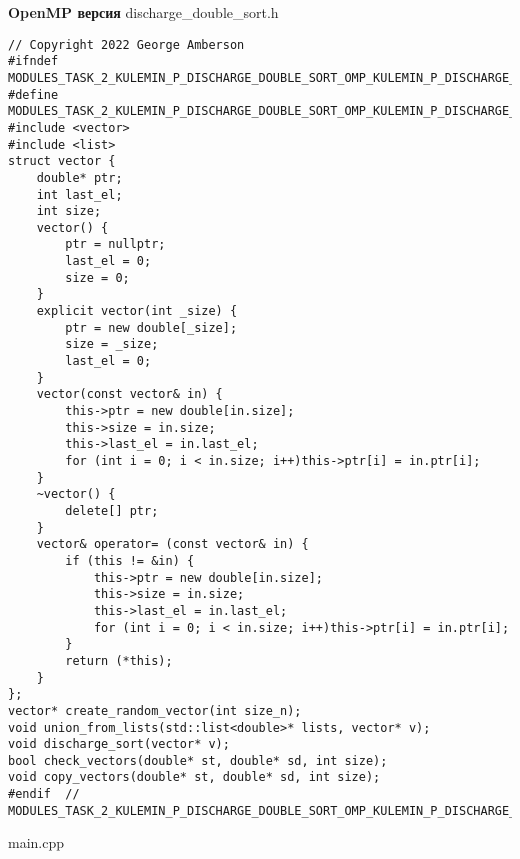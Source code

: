 \documentclass{report}
\begin{document}
\textbf{OpenMP версия}
\newline
\newline \newline discharge\_double\_sort.h
\begin{lstlisting}
// Copyright 2022 George Amberson
#ifndef MODULES_TASK_2_KULEMIN_P_DISCHARGE_DOUBLE_SORT_OMP_KULEMIN_P_DISCHARGE_DOUBLE_SORT_OMP_H_
#define MODULES_TASK_2_KULEMIN_P_DISCHARGE_DOUBLE_SORT_OMP_KULEMIN_P_DISCHARGE_DOUBLE_SORT_OMP_H_
#include <vector>
#include <list>
struct vector {
    double* ptr;
    int last_el;
    int size;
    vector() {
        ptr = nullptr;
        last_el = 0;
        size = 0;
    }
    explicit vector(int _size) {
        ptr = new double[_size];
        size = _size;
        last_el = 0;
    }
    vector(const vector& in) {
        this->ptr = new double[in.size];
        this->size = in.size;
        this->last_el = in.last_el;
        for (int i = 0; i < in.size; i++)this->ptr[i] = in.ptr[i];
    }
    ~vector() {
        delete[] ptr;
    }
    vector& operator= (const vector& in) {
        if (this != &in) {
            this->ptr = new double[in.size];
            this->size = in.size;
            this->last_el = in.last_el;
            for (int i = 0; i < in.size; i++)this->ptr[i] = in.ptr[i];
        }
        return (*this);
    }
};
vector* create_random_vector(int size_n);
void union_from_lists(std::list<double>* lists, vector* v);
void discharge_sort(vector* v);
bool check_vectors(double* st, double* sd, int size);
void copy_vectors(double* st, double* sd, int size);
#endif  // MODULES_TASK_2_KULEMIN_P_DISCHARGE_DOUBLE_SORT_OMP_KULEMIN_P_DISCHARGE_DOUBLE_SORT_OMP_H_
\end{lstlisting}
main.cpp
\end{document}
